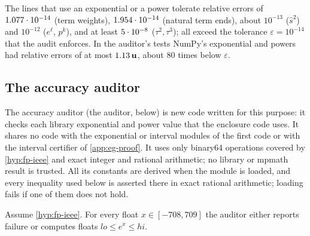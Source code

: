 The lines that use an exponential or a power tolerate relative errors of $1.077\cdot 10^{-14}$ (term weights), $1.954\cdot 10^{-14}$ (natural term ends), about $10^{-13}$ ($\hat s^2$) and $10^{-12}$ ($e^{\ell}$, $p^k$), and at least $5\cdot 10^{-8}$ ($\tau^2,\tau^3$); all exceed the tolerance $\varepsilon=10^{-14}$ that the audit enforces.
In the auditor's tests NumPy's exponential and powers had relative errors of at most $1.13\,\mathbf{u}$, about 80 times below $\varepsilon$.

\subsection{The accuracy auditor}\label{app:egrounding-auditor}

The accuracy auditor (the auditor, below) is new code written for this purpose: it checks each library exponential and power value that the enclosure code uses.
It shares no code with the exponential or interval modules of the first code or with the interval certifier of \cref{app:eg-proof}.
It uses only binary64 operations covered by \cref{hyp:fp-ieee} and exact integer and rational arithmetic; no library or mpmath result is trusted.
All its constants are derived when the module is loaded, and every inequality used below is asserted there in exact rational arithmetic; loading fails if one of them does not hold.

\begin{lemma}\label{lem:eg-auditexp}
Assume \cref{hyp:fp-ieee}.
For every float $x\in[-708,709]$ the auditor either reports failure or computes floats $lo\le e^x\le hi$.
\end{lemma}

